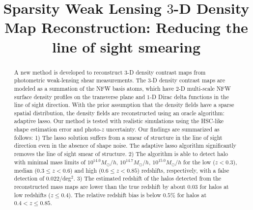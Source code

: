 \documentclass[twocolumn]{aastex62}
\begin{document}
\title{Sparsity Weak Lensing $3$-D Density Map Reconstruction:
Reducing the line of sight smearing}

\begin{abstract}
A new method is developed to reconstruct $3$-D density contrast maps from
photometric weak-lensing shear measurements. The $3$-D density contrast maps
are modeled as a summation of the NFW basis atoms, which have $2$-D multi-scale
NFW surface density profiles on the transverse plane and $1$-D Dirac delta
functions in the line of sight direction. With the prior assumption that the
density fields have a sparse spatial distribution, the density fields are
reconstructed using an oracle algorithm: adaptive lasso. Our method is tested
with realistic simulations using the HSC-like shape estimation error and
photo-$z$ uncertainty.  Our findings are summarized as follows: 1) The lasso
solution suffers from a smear of structure in the line of sight direction even
in the absence of shape noise. The adaptive lasso algorithm significantly
removes the line of sight smear of structure.  2) The algorithm is able to
detect halo with minimal mass limits of $10^{14.0} M_{\odot}/h$, $10^{14.7}
M_{\odot}/h$, $10^{15.0} M_{\odot}/h$ for the low ($z<0.3$), median ($0.3\leq
z< 0.6$) and high ($0.6\leq z< 0.85$) redshifts, respectively, with a false
detection of 0.022/deg$^2$.  3) The estimated redshift of the halos detected
from the reconstructed mass maps are lower than the true redshift by about
$0.03$ for halos at low redshifts ($z\leq 0.4$). The relative redshift bias is
below $0.5\%$ for halos at $0.4<z\leq 0.85$.
\end{abstract}
\end{document}
